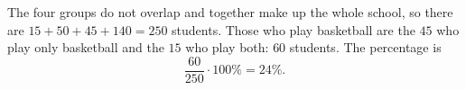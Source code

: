 The four groups do not overlap and together make up the whole school, so there are $15+50+45+140=250$ students. Those who play basketball are the $45$ who play only basketball and the $15$ who play both: $60$ students. The percentage is
\[
\dfrac{60}{250}\cdot100\%=\boxed{24\%}.
\]
